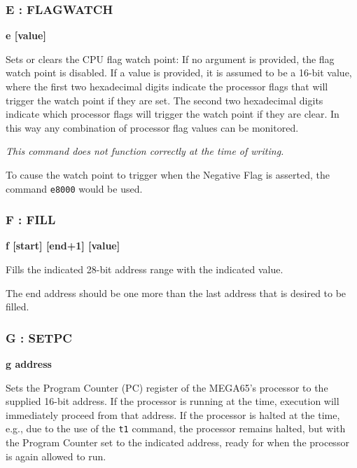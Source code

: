 \subsubsection{E : FLAGWATCH}
\begin{description}[leftmargin=2cm,style=nextline]
\item [Format:] {\bf e [value]}
\item [Usage:]
  Sets or clears the CPU flag watch point: If no argument is provided, the
  flag watch point is disabled. If a value is provided, it is assumed to be
  a 16-bit value, where the first two hexadecimal digits indicate the processor
  flags that will trigger the watch point if they are set. The second two
  hexadecimal digits indicate which processor flags will trigger the watch point
  if they are clear.  In this way any combination of processor flag values can
  be monitored.

  {\em This command does not function correctly at the time of writing.}

\item [Example:]

  To cause the watch point to trigger when the Negative Flag is asserted, the
  command {\tt e8000} would be used.

\end{description}

\subsubsection{F : FILL}
\begin{description}[leftmargin=2cm,style=nextline]
\item [Format:] {\bf f [start] [end+1] [value] }
\item [Usage:] Fills the indicated 28-bit address range with
  the indicated value.
\item [Remarks:]
  The end address should be one more than the last address
  that is desired to be filled.

\end{description}

\subsubsection{G : SETPC}
\begin{description}[leftmargin=2cm,style=nextline]
\item [Format:] {\bf g address}
\item [Usage:] Sets the Program Counter (PC) register of the MEGA65's processor
  to the supplied 16-bit address.  If the processor is running at the time, execution
  will immediately proceed from that address. If the processor is halted at the time,
  e.g., due to the use of the {\tt t1} command, the processor remains halted, but with
  the Program Counter set to the indicated address, ready for when the processor is
  again allowed to run.

\end{description}


